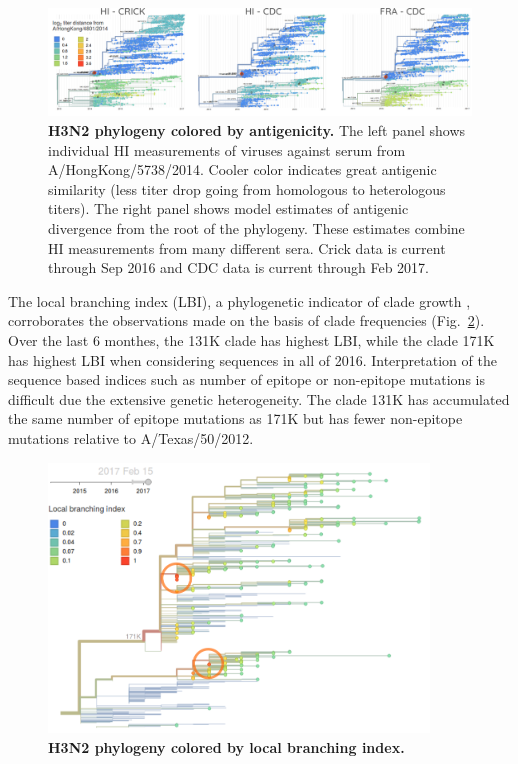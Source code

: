 \documentclass[11pt,oneside,letterpaper]{article}
\begin{document}
\begin{figure}[h!]
	\centering
	\includegraphics[width=1.0\textwidth]{../figures/feb-2017/H3N2_tree_titer_model.png}
	\caption{\textbf{H3N2 phylogeny colored by antigenicity.}
	The left panel shows individual HI measurements of viruses against serum from A/HongKong/5738/2014.
	Cooler color indicates great antigenic similarity (less titer drop going from homologous to heterologous titers).
	The right panel shows model estimates of antigenic divergence from the root of the phylogeny.
	These estimates combine HI measurements from many different sera.
	Crick data is current through Sep 2016 and CDC data is current through Feb 2017.
	}
	\label{H3N2_tree_titer_model}
\end{figure}

The local branching index (LBI), a phylogenetic indicator of clade growth \cite{neher2014predicting}, corroborates the observations made on the basis of clade frequencies (Fig.\ \ref{H3N2_lbi}).
Over the last 6 monthes, the 131K clade has highest LBI, while the clade 171K has highest LBI when considering sequences in all of 2016.
Interpretation of the sequence based indices such as number of epitope or non-epitope mutations is difficult due the extensive genetic heterogeneity.
The clade 131K has accumulated the same number of epitope mutations as 171K but has fewer non-epitope mutations relative to A/Texas/50/2012.

\begin{figure}[H]
	\centering
	\includegraphics[width=0.9\textwidth]{../figures/feb-2017/H3N2_lbi.png}
	\caption{\textbf{H3N2 phylogeny colored by local branching index.}
	}
	\label{H3N2_lbi}
\end{figure}
\end{document}
